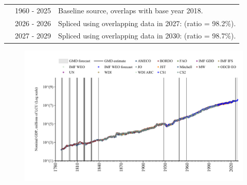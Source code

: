 \documentclass[12pt,a4paper,landscape]{article}
\begin{document}
\begin{adjustbox}{max totalsize={\paperwidth}{\paperheight},center}
\begin{minipage}[t][\textheight][t]{\textwidth}
\begin{table}[H]
\begin{tabular}{|l|l|l|}
\rowcolor{lightgray}\cite{OECD_EO}& 1960 - 2025 &Baseline source, overlaps with base year 2018.\\
\rowcolor{white}\cite{AMECO}& 2026 - 2026 &Spliced using overlapping data in 2027: (ratio = 98.2\%).\\
\rowcolor{lightgray}\cite{IMF_WEO_forecast}& 2027 - 2029 &Spliced using overlapping data in 2030: (ratio = 98.7\%).\\
\hline
\end{tabular}
\end{table}
\begin{figure}[H]
\centering
\includegraphics[width=\textwidth,height=0.6\textheight,keepaspectratio]{graphs/USA_nGDP.pdf}
\end{figure}
\end{minipage}
\end{adjustbox}
\end{document}
